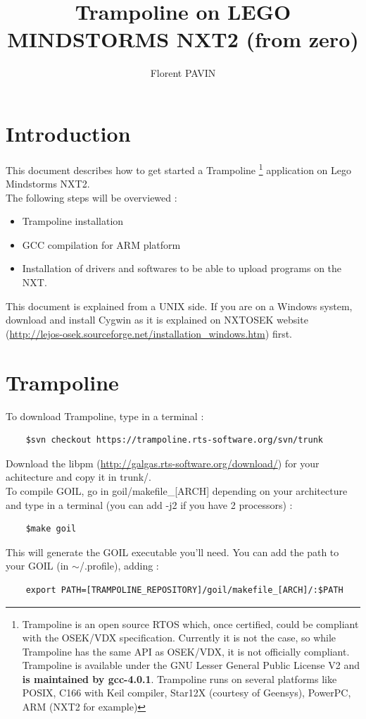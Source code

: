 \documentclass[10pt]{article}
\title{Trampoline on LEGO MINDSTORMS NXT2 (from zero)}
\author{Florent PAVIN}
\begin{document}
\maketitle
\tableofcontents

\newpage

\section{Introduction}
This document describes how to get started a Trampoline \footnote{Trampoline is an open source RTOS which, once certified, could be compliant with the OSEK/VDX specification. Currently it is not the case, so while Trampoline has the same API as OSEK/VDX, it is not officially compliant. Trampoline is available under the GNU Lesser General Public License V2 and \textbf{is maintained by gcc-4.0.1}. Trampoline runs on several platforms like POSIX, C166 with Keil compiler, Star12X (courtesy of Geensys), PowerPC, ARM (NXT2 for example)} application on Lego Mindstorms NXT2.\\
The following steps will be overviewed :
\begin{itemize}
\item Trampoline installation
\item GCC compilation for ARM platform
\item Installation of drivers and softwares to be able to upload programs on the NXT.
\end{itemize}
This document is explained from a UNIX side. If you are on a Windows system, download and install Cygwin as it is explained on NXTOSEK website (\href{http://lejos-osek.sourceforge.net/installation_windows.htm}{http://lejos-osek.sourceforge.net/installation\_windows.htm}) first.

\section{Trampoline}
To download Trampoline, type in a terminal :
	\begin{verbatim}
	$svn checkout https://trampoline.rts-software.org/svn/trunk
	\end{verbatim}
Download the libpm (\href{http://galgas.rts-software.org/download/}{http://galgas.rts-software.org/download/}) for your achitecture and copy it in trunk/.\\
To compile GOIL, go in goil/makefile\_[ARCH] depending on your architecture and type in a terminal (you can add -j2 if you have 2 processors) :
	\begin{verbatim}
	$make goil
	\end{verbatim}
This will generate the GOIL executable you'll need. You can add the path to your GOIL (in $\sim$/.profile), adding :
	\begin{verbatim}
	export PATH=[TRAMPOLINE_REPOSITORY]/goil/makefile_[ARCH]/:$PATH
	\end{verbatim}
\end{document}
